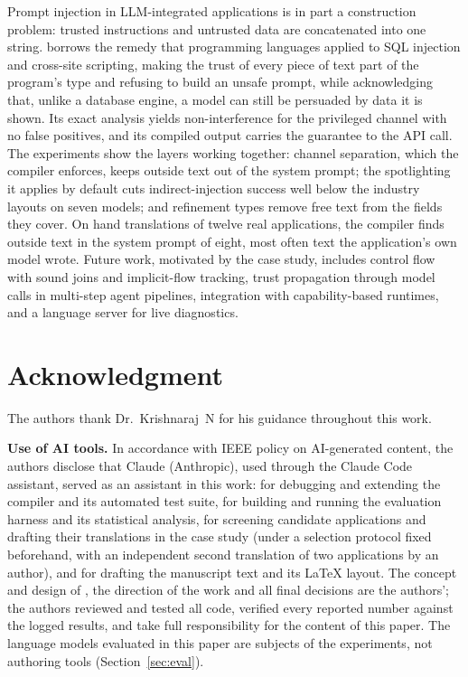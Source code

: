 \documentclass[journal]{IEEEtran}
\begin{document}
Prompt injection in LLM-integrated applications is in part a construction problem: trusted instructions and untrusted data are concatenated into one string. \TL{} borrows the remedy that programming languages applied to SQL injection and cross-site scripting, making the trust of every piece of text part of the program's type and refusing to build an unsafe prompt, while acknowledging that, unlike a database engine, a model can still be persuaded by data it is shown. Its exact analysis yields non-interference for the privileged channel with no false positives, and its compiled output carries the guarantee to the API call. The experiments show the layers working together: channel separation, which the compiler enforces, keeps outside text out of the system prompt; the spotlighting it applies by default cuts indirect-injection success well below the industry layouts on seven models; and refinement types remove free text from the fields they cover. On hand translations of twelve real applications, the compiler finds outside text in the system prompt of eight, most often text the application's own model wrote. Future work, motivated by the case study, includes control flow with sound joins and implicit-flow tracking, trust propagation through model calls in multi-step agent pipelines, integration with capability-based runtimes, and a language server for live diagnostics.

\section*{Acknowledgment}

The authors thank Dr.~Krishnaraj~N for his guidance throughout this work.

\textbf{Use of AI tools.} In accordance with IEEE policy on AI-generated content, the authors disclose that Claude (Anthropic), used through the Claude Code assistant, served as an assistant in this work: for debugging and extending the compiler and its automated test suite, for building and running the evaluation harness and its statistical analysis, for screening candidate applications and drafting their \TL{} translations in the case study (under a selection protocol fixed beforehand, with an independent second translation of two applications by an author), and for drafting the manuscript text and its \LaTeX{} layout. The concept and design of \TL{}, the direction of the work and all final decisions are the authors'; the authors reviewed and tested all code, verified every reported number against the logged results, and take full responsibility for the content of this paper. The language models evaluated in this paper are subjects of the experiments, not authoring tools (Section~\ref{sec:eval}).



\end{document}
